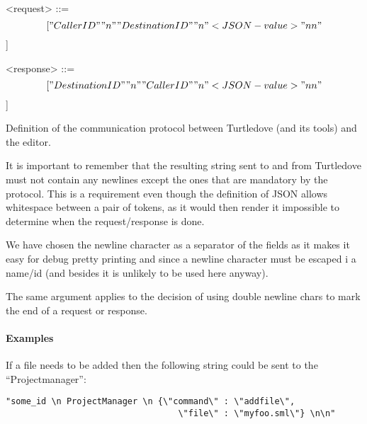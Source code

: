 \begin{nonfloatingfigure}
  \begin{grammar}
    <request> ::= \[[ "CallerID" "\\n" "DestinationID" "\\n" <JSON-value> "\\n\\n" \]]
    
    <response> ::= \[[ "DestinationID" "\\n" "CallerID" "\\n" <JSON-value> "\\n\\n" \]]
  \end{grammar}
  
  \caption{Definition of the communication protocol between Turtledove (and its
    tools) and the editor.}
  \label{fig:intercom-protocol-definition}

\end{nonfloatingfigure}


It is important to remember that the resulting string sent to and from
Turtledove must not contain any newlines except the ones that are mandatory by
the protocol. This is a requirement even though the definition of JSON allows
whitespace between a pair of tokens, as it would then render it impossible to
determine when the request/response is done.

We have chosen the newline character as a separator of the fields as it
makes it easy for debug pretty printing and since a newline character must be
escaped i a name/id (and besides it is unlikely to be used here anyway).

The same argument applies to the decision of using double newline chars to mark
the end of a request or response. 


\paragraph{Examples}



\begin{example} If a file needs to be added then the following string could be
  sent to the ``Projectmanager'':
\begin{verbatim}
"some_id \n ProjectManager \n {\"command\" : \"addfile\", 
                                  \"file\" : \"myfoo.sml\"} \n\n"
\end{verbatim}
\end{example}



